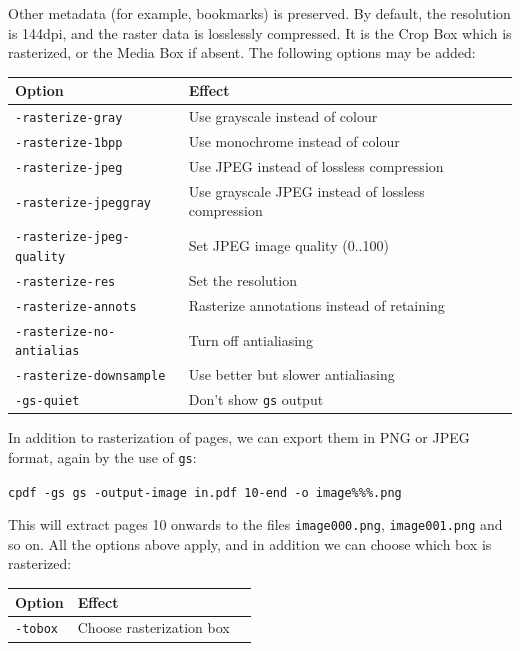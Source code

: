 \documentclass{book}
\begin{document}
\noindent Other metadata (for example, bookmarks) is preserved. By default, the resolution is 144dpi, and the raster data is losslessly compressed. It is the Crop Box which is rasterized, or the Media Box if absent. The following options may be added:

\bigskip
\noindent\begin{tabular}{lp{8cm}l}
Option & Effect\\\hline
{\small\texttt{-rasterize-gray}} & Use grayscale instead of colour \\
{\small\texttt{-rasterize-1bpp}} & Use monochrome instead of colour\\
{\small\texttt{-rasterize-jpeg}} & Use JPEG instead of lossless compression\\
{\small\texttt{-rasterize-jpeggray}} & Use grayscale JPEG instead of lossless compression\\
{\small\texttt{-rasterize-jpeg-quality}} & Set JPEG image quality (0..100)\\
{\small\texttt{-rasterize-res}} & Set the resolution\\
{\small\texttt{-rasterize-annots}} & Rasterize annotations instead of retaining\\
{\small\texttt{-rasterize-no-antialias}} & Turn off antialiasing\\
{\small\texttt{-rasterize-downsample}} & Use better but slower antialiasing\\
{\small\texttt{-gs-quiet}} & Don't show \texttt{gs} output\\
\end{tabular}
\bigskip

\noindent In addition to rasterization of pages, we can export them in PNG or JPEG format, again by the use of \texttt{gs}:

  \begin{framed}
  \noindent\small\verb!cpdf -gs gs -output-image in.pdf 10-end -o image%%%.png!
  \end{framed}

\noindent This will extract pages 10 onwards to the files \texttt{image000.png}, \texttt{image001.png} and so on. All the options above apply, and in addition we can choose which box is rasterized:

\bigskip
\noindent\begin{tabular}{lp{8cm}l}
Option & Effect\\\hline
{\small\texttt{-tobox}} & Choose rasterization box \\
\end{tabular}
\bigskip
\end{document}
